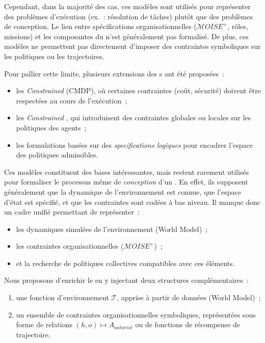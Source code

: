 \noindent
Cependant, dans la majorité des cas, ces modèles sont utilisés pour représenter des problèmes d'exécution (ex.~: résolution de tâches) plutôt que des problèmes de conception. Le lien entre spécifications organisationnelles ($\mathcal{M}OISE^+$, rôles, missions) et les composantes du  n'est généralement pas formalisé. De plus, ces modèles ne permettent pas directement d'imposer des contraintes symboliques sur les politiques ou les trajectoires.

\medskip

\noindent
Pour pallier cette limite, plusieurs extensions des s ont été proposées~:
\begin{itemize}
  \item les \textit{Constrained } (CMDP), où certaines contraintes (coût, sécurité) doivent être respectées au cours de l'exécution~;
  \item les \textit{Constrained }, qui introduisent des contraintes globales ou locales sur les politiques des agents~;
  \item les formulations basées sur des \textit{specifications logiques} pour encadrer l'espace des politiques admissibles.
\end{itemize}

\noindent
Ces modèles constituent des bases intéressantes, mais restent rarement utilisés pour formaliser le processus même de \textit{conception} d'un . En effet, ils supposent généralement que la dynamique de l'environnement est connue, que l'espace d'état est spécifié, et que les contraintes sont codées à bas niveau. Il manque donc un cadre unifié permettant de représenter~:
\begin{itemize}
  \item les dynamiques simulées de l'environnement (World Model)~;
  \item les contraintes organisationnelles ($\mathcal{M}OISE^+$)~;
  \item et la recherche de politiques collectives compatibles avec ces éléments.
\end{itemize}

\medskip

\noindent
Nous proposons d'enrichir le  en y injectant deux structures complémentaires~:
\begin{enumerate}
  \item une fonction d'environnement $\mathcal{T}$, apprise à partir de données (World Model)~;
  \item un ensemble de contraintes organisationnelles symboliques, représentées sous forme de relations $(h, o) \mapsto A_{autorisé}$ ou de fonctions de récompense de trajectoire.
\end{enumerate}

